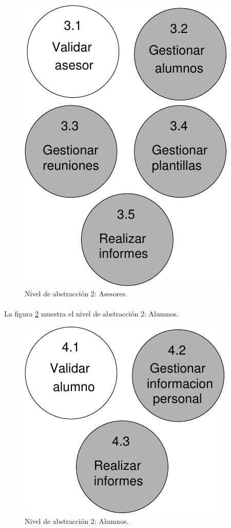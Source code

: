         \begin{figure}[!ht]
            \begin{center}
            \includegraphics[]{08.Analisis_Funcional/8.2.DFDs/Niveles/Diagramas/nivel2-3.pdf}
            \caption{Nivel de abstracción 2: Asesores.}
            \label{diagramaNivel2-3}
            \end{center}
         \end{figure}

  \paragraph{}La figura \ref{diagramaNivel2-4} muestra el nivel de abstracción
  2: Alumnos.

        \begin{figure}[!ht]
            \begin{center}
            \includegraphics[]{08.Analisis_Funcional/8.2.DFDs/Niveles/Diagramas/nivel2-4.pdf}
            \caption{Nivel de abstracción 2: Alumnos.}
            \label{diagramaNivel2-4}
            \end{center}
         \end{figure}